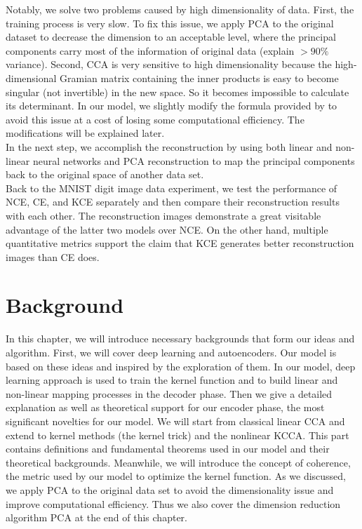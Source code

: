 \documentclass[12pt]{report} %
\begin{document}
Notably, we solve two problems caused by high dimensionality of data. First, the training process is very slow. To fix this issue, we apply PCA to the original dataset to decrease the dimension to an acceptable level, where the principal components carry most of the information of original data (explain $>90\%$ variance). Second, CCA is very sensitive to high dimensionality because the high-dimensional Gramian matrix\cite{GM} containing the inner products is easy to become singular (not invertible)\cite{SM} in the new space. So it becomes impossible to calculate its determinant. In our model, we slightly modify the formula provided by \cite{ECCA} to avoid this issue at a cost of losing some computational efficiency. The modifications will be explained later. \\
In the next step, we accomplish the reconstruction by using both linear and non-linear neural networks and PCA reconstruction to map the principal components back to the original space of another data set. \\
Back to the MNIST digit image data experiment, we test the performance of NCE, CE, and KCE separately and then compare their reconstruction results with each other. The reconstruction images demonstrate a great visitable advantage of the latter two models over NCE. On the other hand, multiple quantitative metrics support the claim that KCE generates better reconstruction images than CE does. 

\chapter{Background}
In this chapter, we will introduce necessary backgrounds that form our ideas and algorithm. First, we will cover deep learning and autoencoders. Our model is based on these ideas and inspired by the exploration of them. In our model, deep learning approach is used to train the kernel function and to build linear and non-linear mapping processes in the decoder phase. 
Then we give a detailed explanation as well as theoretical support for our encoder phase, the most significant novelties for our model. We will start from classical linear CCA and extend to kernel methods (the kernel trick) and the nonlinear KCCA. This part contains definitions and fundamental theorems used in our model and their theoretical backgrounds. Meanwhile, we will introduce the concept of coherence, the metric used by our model to optimize the kernel function. 
As we discussed, we apply PCA to the original data set to avoid the dimensionality issue and improve computational efficiency. Thus we also cover the dimension reduction algorithm PCA at the end of this chapter. 
\end{document}
